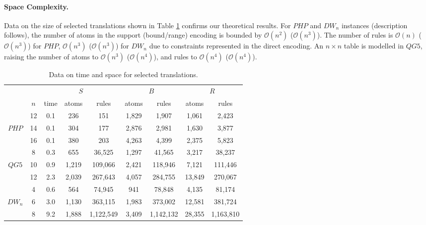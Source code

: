 \documentclass{tlp}
\newcommand{\encsup}{$S$}
\newcommand{\encbou}{$B$}
\newcommand{\encran}{$R$}
\begin{document}
\paragraph{Space Complexity.} Data on the size of selected translations shown in Table \ref{tab:timespace} confirms our theoretical results. For $PHP$ and $DW_n$ instances (description follows), the number of atoms in the support (bound/range) encoding is bounded by $\mathcal{O}(n^2)$ ($\mathcal{O}(n^3)$). The number of rules is $\mathcal{O}(n)$ ($\mathcal{O}(n^3)$) for $PHP$, $\mathcal{O}(n^3)$ ($\mathcal{O}(n^3)$) for $DW_n$ due to constraints represented in the direct encoding. An $n \times n$ table is modelled in $QG5$, raising the number of atoms to $\mathcal{O}(n^3)$ ($\mathcal{O}(n^4)$), and rules to $\mathcal{O}(n^4)$ ($\mathcal{O}(n^4)$).
\begin{table}
\caption{Data on time and space for selected translations.}
\label{tab:timespace}
\begin{minipage}{\textwidth}
\begin{tabular}{ccccccccc} \hline\hline
&     & \multicolumn{3}{c}{\encsup} & \multicolumn{2}{c}{\encbou} & \multicolumn{2}{c}{\encran} \\
& $n$ & time & atoms & rules & atoms & rules & atoms & rules \\ \hline
      & 12 & 0.1 & 236 & 151 & 1,829 & 1,907 & 1,061 & 2,423 \\
$PHP$ & 14 & 0.1 & 304 & 177 & 2,876 & 2,981 & 1,630 & 3,877 \\
      & 16 & 0.1 & 380 & 203 & 4,263 & 4,399 & 2,375 & 5,823 \\ \noalign{\vspace {.2cm}}

      &  8 & 0.3 &   655 &  36,525 & 1,297 &  41,565 &  3,217 &  38,237 \\
$QG5$ & 10 & 0.9 & 1,219 & 109,066 & 2,421 & 118,946 &  7,121 & 111,446 \\
      & 12 & 2.3 & 2,039 & 267,643 & 4,057 & 284,755 & 13,849 & 270,067 \\ \noalign{\vspace {.2cm}}

      &  4 & 0.6 &   564 &    74,945 &    941 &    78,848 &  4,135 &    81,174 \\
$DW_n$&  6 & 3.0 & 1,130 &   363,115 &  1,983 &   373,002 & 12,581 &   381,724 \\
      &  8 & 9.2 & 1,888 & 1,122,549 &  3,409 & 1,142,132 & 28,355 & 1,163,810 \\ \hline\hline
\end{tabular}
\vspace{-2\baselineskip}
\end{minipage}
\end{table}
\end{document}
